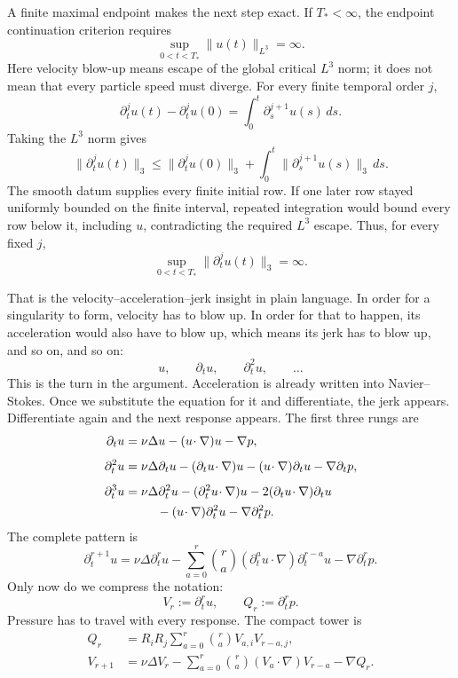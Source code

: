 A finite maximal endpoint makes the next step exact.  If \(T_*<\infty\), the
endpoint continuation criterion requires
\[
\sup_{0<t<T_*}\|u(t)\|_{L^3}=\infty.
\]
Here velocity blow-up means escape of the global critical \(L^3\) norm; it
does not mean that every particle speed must diverge.  For every finite temporal
order \(j\),
\[
\partial_t^ju(t)-\partial_t^ju(0)
=\int_0^t\partial_s^{j+1}u(s)\,ds.
\]
Taking the \(L^3\) norm gives
\[
\|\partial_t^ju(t)\|_3
\leq \|\partial_t^ju(0)\|_3
  +\int_0^t\|\partial_s^{j+1}u(s)\|_3\,ds.
\]
The smooth datum supplies every finite initial row.  If one later row stayed
uniformly bounded on the finite interval, repeated integration would bound
every row below it, including \(u\), contradicting the required \(L^3\)
escape.  Thus, for every fixed \(j\),
\[
\sup_{0<t<T_*}\|\partial_t^ju(t)\|_3=\infty.
\]

That is the velocity--acceleration--jerk insight in plain language.  In order
for a singularity to form, velocity has to blow up.  In order for
that to happen, its acceleration would also have to blow up, which means its
jerk has to blow up, and so on, and so on:
\[
u,\qquad \partial_tu,\qquad \partial_t^2u,\qquad\ldots
\]
This is the turn in the argument.  Acceleration is already written into
Navier--Stokes.  Once we substitute the equation for it and differentiate, the
jerk appears.  Differentiate again and the next response appears.  The first
three rungs are
\[
\begin{aligned}
\partial_tu
&=\nu\Delta u-(u\!\cdot\nabla)u-\nabla p,\\[4pt]
\partial_t^2u
&=\nu\Delta\partial_tu
  -(\partial_tu\!\cdot\nabla)u
  -(u\!\cdot\nabla)\partial_tu
  -\nabla\partial_tp,\\[4pt]
\partial_t^3u
&=\nu\Delta\partial_t^2u
  -(\partial_t^2u\!\cdot\nabla)u
  -2(\partial_tu\!\cdot\nabla)\partial_tu\\
&\hspace{2.6em}
  -(u\!\cdot\nabla)\partial_t^2u
  -\nabla\partial_t^2p.
\end{aligned}
\]
The complete pattern is
\[
\partial_t^{r+1}u
=\nu\Delta\partial_t^ru
-\sum_{a=0}^{r}\binom ra
  (\partial_t^au\!\cdot\nabla)\partial_t^{r-a}u
-\nabla\partial_t^rp.
\]
Only now do we compress the notation:
\[
V_r:=\partial_t^ru,
\qquad
Q_r:=\partial_t^rp.
\]
Pressure has to travel with every response.  The compact tower is
\[
\begin{aligned}
Q_r
&=R_iR_j\sum_{a=0}^{r}\binom ra V_{a,i}V_{r-a,j},\\
V_{r+1}
&=\nu\Delta V_r
  -\sum_{a=0}^{r}\binom ra(V_a\!\cdot\nabla)V_{r-a}
  -\nabla Q_r.
\end{aligned}
\]


